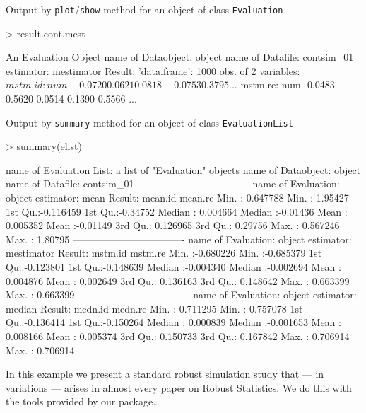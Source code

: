 \documentclass[11pt]{article}
\newcommand{\code}[1]{{\tt #1}}
\begin{document}
\begin{footnotesize}
Output by \code{plot}/\code{show}-method for an object of class \code{Evaluation}
\begin{Schunk}
\begin{Sinput}
> result.cont.mest
\end{Sinput}
\begin{Soutput}
An Evaluation Object
name of Dataobject: object
name of Datafile: contsim_01
estimator: mestimator
Result: 'data.frame':	1000 obs. of  2 variables:
 $ mstm.id: num  -0.0720  0.0621  0.0818 -0.0753  0.3795 ...
 $ mstm.re: num  -0.0483  0.5620  0.0514  0.1390  0.5566 ...
\end{Soutput}
\end{Schunk}
\end{footnotesize}
\begin{footnotesize}
Output by \code{summary}-method for an object of class \code{EvaluationList}
\begin{Schunk}
\begin{Sinput}
> summary(elist)
\end{Sinput}
\begin{Soutput}
name of Evaluation List: a list of "Evaluation" objects
name of Dataobject: object
name of Datafile: contsim_01
----------------------------------
name of Evaluation: object
estimator: mean
Result:
    mean.id             mean.re        
 Min.   :-0.647788   Min.   :-1.95427  
 1st Qu.:-0.116459   1st Qu.:-0.34752  
 Median : 0.004664   Median :-0.01436  
 Mean   : 0.005352   Mean   :-0.01149  
 3rd Qu.: 0.126965   3rd Qu.: 0.29756  
 Max.   : 0.567246   Max.   : 1.80795  
----------------------------------
name of Evaluation: object
estimator: mestimator
Result:
    mstm.id             mstm.re         
 Min.   :-0.680226   Min.   :-0.685379  
 1st Qu.:-0.123801   1st Qu.:-0.148639  
 Median :-0.004340   Median :-0.002694  
 Mean   : 0.004876   Mean   : 0.002649  
 3rd Qu.: 0.136163   3rd Qu.: 0.148642  
 Max.   : 0.663399   Max.   : 0.663399  
----------------------------------
name of Evaluation: object
estimator: median
Result:
    medn.id             medn.re         
 Min.   :-0.711295   Min.   :-0.757078  
 1st Qu.:-0.136414   1st Qu.:-0.150264  
 Median : 0.000839   Median :-0.001653  
 Mean   : 0.008166   Mean   : 0.005374  
 3rd Qu.: 0.150733   3rd Qu.: 0.167842  
 Max.   : 0.706914   Max.   : 0.706914  
\end{Soutput}
\end{Schunk}
\end{footnotesize}
\begin{small}
In this example we present a standard robust simulation study that --- in variations --- arises in almost
every paper on Robust Statistics. We do this with the tools provided by our package\ldots
\end{small}
\end{document}
